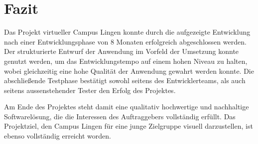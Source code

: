 \section{Fazit}
\label{sec:Fazit}

Das Projekt virtueller Campus Lingen konnte durch die aufgezeigte Entwicklung nach einer Entwicklungsphase von 8 Monaten
erfolgreich abgeschlossen werden.
Der strukturierte Entwurf der Anwendung im Vorfeld der Umsetzung konnte genutzt werden, um das Entwicklungstempo
auf einem hohen Niveau zu halten, wobei gleichzeitig eine hohe Qualität der Anwendung gewahrt werden konnte.
Die abschließende Testphase bestätigt sowohl seitens des Entwicklerteams, als auch seitens aussenstehender
Tester den Erfolg des Projektes.

Am Ende des Projektes steht damit eine qualitativ hochwertige und nachhaltige Softwarelösung, die die Interessen
des Auftraggebers vollständig erfüllt. Das Projektziel, den Campus Lingen für eine
junge Zielgruppe visuell darzustellen, ist ebenso vollständig erreicht worden.